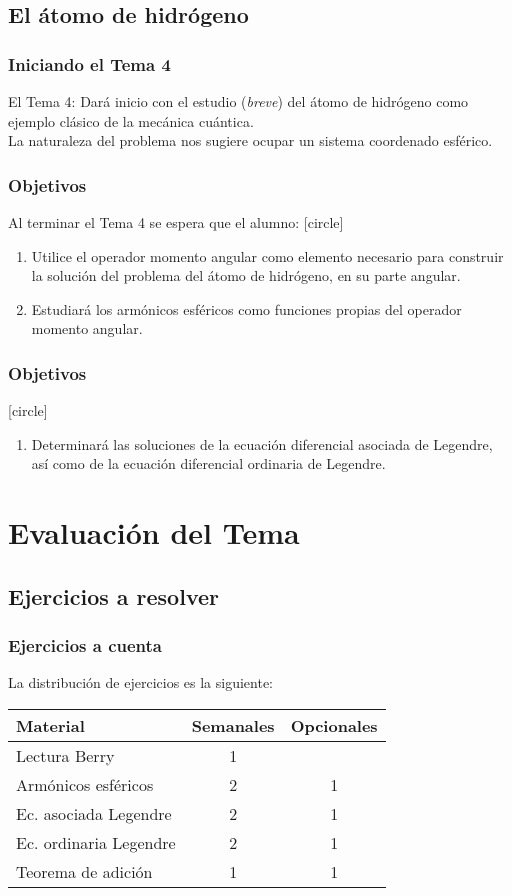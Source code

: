 \documentclass[12pt]{beamer}
\begin{document}
\subsection{El átomo de hidrógeno}

\begin{frame}
\frametitle{Iniciando el Tema 4}
El Tema 4: Dará inicio con el estudio (\emph{breve}) del átomo de hidrógeno como ejemplo clásico de la mecánica cuántica.
\\
\bigskip
\pause
La naturaleza del problema nos sugiere ocupar un sistema coordenado esférico.
\end{frame}
\begin{frame}
\frametitle{Objetivos}
Al terminar el Tema 4 se espera que el alumno:
[circle]
\begin{enumerate}[<+->]
\item Utilice el operador momento angular como elemento necesario para construir la solución del problema del átomo de hidrógeno, en su parte angular.
\item Estudiará los armónicos esféricos como funciones propias del operador momento angular.
\seti
\end{enumerate}
\end{frame}
\begin{frame}
\frametitle{Objetivos}
[circle]
\begin{enumerate}[<+->]
\conti
\item Determinará las soluciones de la ecuación diferencial asociada de Legendre, así como de la ecuación diferencial ordinaria de Legendre.
\end{enumerate}
\end{frame}

\section{Evaluación del Tema}
\subsection{Ejercicios a resolver}

\begin{frame}
\frametitle{Ejercicios a cuenta}
La distribución de ejercicios es la siguiente:
\pause
\renewcommand{\arraystretch}{1.25}
\begin{table}
\centering
\begin{tabular}{l c c}
Material & Semanales & Opcionales \\ \hline
Lectura Berry & 1 &  \\ \hline
Armónicos esféricos  & 2 & 1 \\ \hline
Ec. asociada Legendre & 2 & 1 \\ \hline    
Ec. ordinaria Legendre & 2 & 1 \\ \hline    
Teorema de adición & 1 & 1
\end{tabular}
\end{table}
\end{frame}
\end{document}

